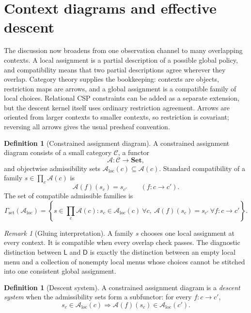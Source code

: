 \documentclass[11pt]{article}
\theoremstyle{plain}
\theoremstyle{definition}
\newtheorem{definition}[theorem]{Definition}
\theoremstyle{remark}
\newtheorem{remark}[theorem]{Remark}
\newcommand{\LocalAdm}{\mathcal{A}_{\mathrm{loc}}}
\begin{document}
\section{Context diagrams and effective descent}\label{sec:descent}

The discussion now broadens from one observation channel to many overlapping
contexts. A local assignment is a partial description of a possible global
policy, and compatibility means that two partial descriptions agree wherever
they overlap. Category theory supplies the bookkeeping: contexts are objects,
restriction maps are arrows, and a global assignment is a compatible family of
local choices. Relational CSP constraints can be added as a separate extension,
but the descent kernel itself uses ordinary restriction agreement. Arrows are
oriented from larger contexts to smaller contexts, so restriction is covariant;
reversing all arrows gives the usual presheaf convention.

\begin{definition}[Constrained assignment diagram]\label{def:restr}
A constrained assignment diagram consists of a small category $\mathcal C$, a
functor
\[
\mathcal A:\mathcal C\to\mathbf{Set},
\]
and objectwise admissibility sets
$\LocalAdm(c)\subseteq\mathcal A(c)$. Standard compatibility of a family
$s\in\prod_c\mathcal A(c)$ is
\[
\mathcal A(f)(s_c)=s_{c'}
\qquad(f:c\to c').
\]
The set of compatible admissible families is
\[
\Gamma_{\mathrm{set}}(\LocalAdm)=
\left\{s\in\prod_c\mathcal A(c):
 s_c\in\LocalAdm(c)\ \forall c,
 \ \mathcal A(f)(s_c)=s_{c'}\ \forall f:c\to c'\right\}.
\]
\end{definition}

\begin{remark}[Gluing interpretation]
A family $s$ chooses one local assignment at every context. It is compatible
when every overlap check passes. The diagnostic distinction between $\mathsf L$
and $\mathsf D$ is exactly the distinction between an empty local menu and a
collection of nonempty local menus whose choices cannot be stitched into one
consistent global assignment.
\end{remark}

\begin{definition}[Descent system]\label{def:Av}
A constrained assignment diagram is a \emph{descent system} when the
admissibility sets form a subfunctor: for every $f:c\to c'$,
\[
s_c\in\LocalAdm(c)
\Longrightarrow
\mathcal A(f)(s_c)\in\LocalAdm(c').
\]
\end{definition}
\end{document}
